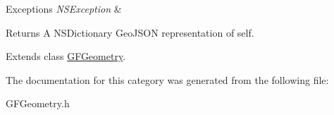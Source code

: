 \begin{DoxyExceptions}{Exceptions}
{\em N\+S\+Exception} & \\
\hline
\end{DoxyExceptions}
\begin{DoxyReturn}{Returns}
A N\+S\+Dictionary Geo\+J\+S\+O\+N representation of self. 
\end{DoxyReturn}


Extends class \hyperlink{interface_g_f_geometry_a89a1dd53c1d9a51fd5b933fde28be5b7}{G\+F\+Geometry}.



The documentation for this category was generated from the following file\+:\begin{DoxyCompactItemize}
\item 
G\+F\+Geometry.\+h\end{DoxyCompactItemize}
